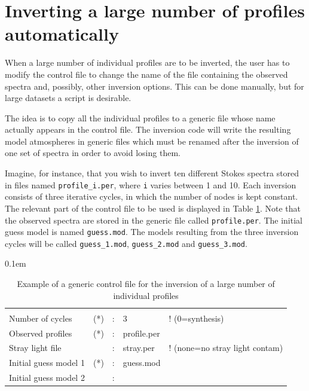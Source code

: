 \documentclass[11pt]{report}
\begin{document}
\section{Inverting a large number of profiles automatically}
\label{corremuchos}
When a large number of individual profiles are to be inverted, the
user has to modify the control file to change the name of the 
file containing the observed spectra and, possibly, other inversion
options. This can be done manually, but for large datasets a 
script is desirable.  

The idea is to copy all the individual profiles to a generic file whose
name actually appears in the control file. The inversion code will write the
resulting model atmospheres in generic files which must be renamed
after the inversion of one set of spectra in order to avoid losing them.

Imagine, for instance, that you wish to invert ten 
different Stokes spectra stored in files named {\tt profile\_i.per}, 
where {\tt i} varies between 1 and 10. Each inversion consists of
three iterative cycles, in which the number of nodes is kept constant. 
The relevant part of the control file to be used is displayed in
Table \ref{multiple}. Note that the observed spectra are stored in
the generic file called {\tt profile.per}. The initial guess model is named
{\tt guess.mod}. The models resulting from the three inversion
cycles will be called {\tt guess\_1.mod}, {\tt guess\_2.mod} and
{\tt guess\_3.mod}. 


\begin{table}[t]
\small
\tabcolsep 0.1em
\caption{Example of a generic control file for the inversion of a large number
of individual profiles}
\label{multiple}
\begin{tabular}{lrcll}
 &  & &            &       \\
Number of cycles          &(*)&:&3             &! (0=synthesis)  \\
Observed profiles         &(*)&:&profile.per &             \\
Stray light file          &   &:&stray.per    & ! (none=no stray light contam)\\
Initial guess model 1     &(*)&:&guess.mod   &\\
Initial guess model 2     &   &:&           &\\
\end{tabular}
\end{table}
\end{document}

